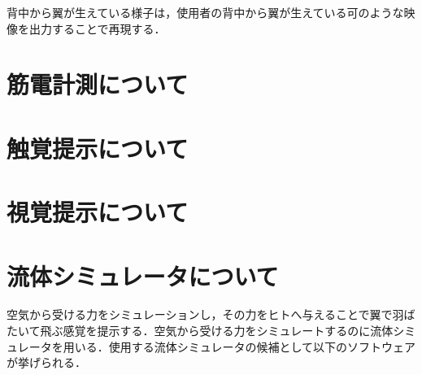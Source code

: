         背中から翼が生えている様子は，使用者の背中から翼が生えている可のような映像を出力することで再現する．  


\section{筋電計測について}

\section{触覚提示について}

\section{視覚提示について}

\section{流体シミュレータについて} 
    空気から受ける力をシミュレーションし，その力をヒトへ与えることで翼で羽ばたいて飛ぶ感覚を提示する．空気から受ける力をシミュレートするのに流体シミュレータを用いる．使用する流体シミュレータの候補として以下のソフトウェアが挙げられる．

